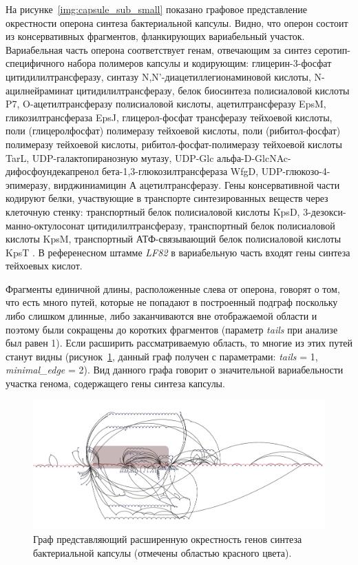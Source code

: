 На рисунке~\ref{img:capsule_sub_small} показано графовое представление окрестности оперона синтеза бактериальной капсулы. 
Видно, что оперон состоит из консервативных фрагментов, фланкирующих вариабельный участок. Вариабельная часть оперона соответствует генам, отвечающим за синтез серотип-специфичного набора полимеров капсулы и кодирующим: глицерин-3-фосфат цитидилилтрансферазу, синтазу N,N'-диацетиллегионаминовой кислоты, N-ацилнейраминат цитидилилтрансферазу, белок биосинтеза полисиаловой кислоты P7, O-ацетилтрансферазу полисиаловой кислоты, ацетилтрансферазу EpsM, гликозилтрансфераза EpsJ, глицерол-фосфат трансферазу тейхоевой кислоты, поли (глицеролфосфат) полимеразу тейхоевой кислоты, поли (рибитол-фосфат) полимеразу тейхоевой кислоты, рибитол-фосфат-полимеразу тейхоевой кислоты TarL, UDP-галактопиранозную мутазу, UDP-Glc альфа-D-GlcNAc-дифосфоундекапренол бета-1,3-глюкозилтрансфераза WfgD, UDP-глюкозо-4-эпимеразу, вирджиниамицин А ацетилтрансферазу. Гены консервативной части кодируют белки, участвующие в транспорте синтезированных веществ через клеточную стенку: транспортный белок полисиаловой кислоты KpsD, 3-дезокси-манно-октулосонат цитидилилтрансферазу, транспортный белок полисиаловой кислоты KpsM, транспортный АТФ-связывающий белок полисиаловой кислоты KpsT \cite{clarke1999genetic}. В референесном штамме \textit{LF82} в вариабельную часть входят гены синтеза тейхоевых кислот. 

Фрагменты единичной длины, расположенные слева от оперона, говорят о том, что есть много путей, которые не попадают в построенный подграф поскольку либо слишком длинные, либо заканчиваются вне отображаемой области и поэтому были сокращены до коротких фрагментов (параметр \textit{tails} при анализе был равен 1). Если расширить рассматриваемую область, то многие из этих путей станут видны (рисунок~\ref{img:capsule_sub_large}, данный граф получен с параметрами: \textit{tails} = 1, \textit{minimal\_edge} = 2). Вид данного графа говорит о значительной вариабельности участка генома, содержащего гены синтеза капсулы.

\begin{figure}[!ht] 
  \center
    \includegraphics[width=\textwidth]{Dissertation/images/subgraphs/capsular_subgraph2_red.png}
  \caption{Граф представляющий расширенную окрестность генов синтеза бактериальной капсулы (отмечены областью красного цвета). }
  \label{img:capsule_sub_large} 
\end{figure}

